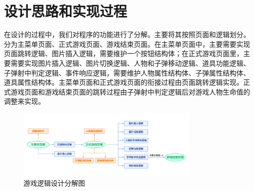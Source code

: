 \section{设计思路和实现过程}
在设计的过程中，我们对程序的功能进行了分解。主要将其按照页面和逻辑划分。分为主菜单页面、正式游戏页面、游戏结束页面。在主菜单页面中，主要需要实现页面跳转逻辑、图片插入逻辑，需要维护一个按钮结构体；在正式游戏页面里，主要需要实现图片插入逻辑、图片切换逻辑、人物和子弹移动逻辑、道具功能逻辑、子弹射中判定逻辑、事件响应逻辑，需要维护人物属性结构体、子弹属性结构体、道具属性结构体。主菜单页面和正式游戏页面的衔接过程由页面跳转逻辑实现。正式游戏页面和游戏结束页面的跳转过程由子弹射中判定逻辑后对游戏人物生命值的调整来实现。
\begin{figure}[htbp]
    \vspace{13pt} %
    \centering
    \includegraphics[width=0.8\textwidth]{images/3-1.jpg}
    \caption{游戏逻辑设计分解图}%
\end{figure}
